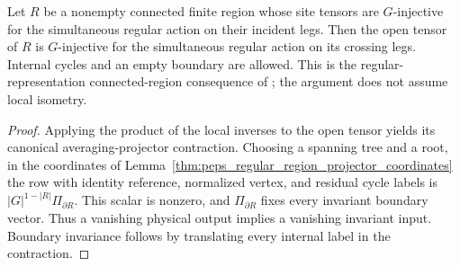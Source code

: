 \begin{lemma}%
    \label{thm:peps_connected_regular_region_injectivity}
    \leanok
    Let $R$ be a nonempty connected finite region whose site tensors
    are $G$-injective for the simultaneous regular action on their
    incident legs. Then the open tensor of $R$ is $G$-injective
    for the simultaneous regular action on its crossing legs.
    Internal cycles and an empty boundary are allowed.
    This is the regular-representation connected-region consequence of
    \cite[Lemma~5.2 and the following observation]{Schuch2010PEPS};
    the argument does not assume local isometry.
\end{lemma}
\begin{proof}\leanok
    Applying the product of the local inverses to the open tensor yields
    its canonical averaging-projector contraction.
    Choosing a spanning tree and a root, in the coordinates of
    Lemma~\ref{thm:peps_regular_region_projector_coordinates} the row
    with identity reference, normalized vertex, and residual cycle labels
    is $|G|^{1-|R|}\Pi_{\partial R}$. This scalar is nonzero, and
    $\Pi_{\partial R}$ fixes every invariant boundary vector. Thus a
    vanishing physical output implies a vanishing invariant input.
    Boundary invariance follows by translating every internal label
    in the contraction.
\end{proof}

